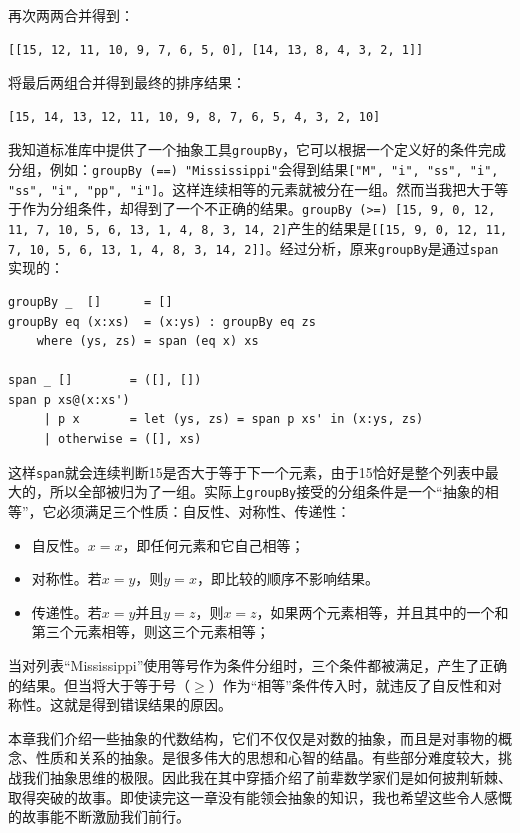 \documentclass{article}
\begin{document}
再次两两合并得到：

\begin{verbatim}
[[15, 12, 11, 10, 9, 7, 6, 5, 0], [14, 13, 8, 4, 3, 2, 1]]
\end{verbatim}

将最后两组合并得到最终的排序结果：

\begin{verbatim}
[15, 14, 13, 12, 11, 10, 9, 8, 7, 6, 5, 4, 3, 2, 10]
\end{verbatim}

我知道标准库中提供了一个抽象工具\texttt{groupBy}，它可以根据一个定义好的条件完成分组，例如：\texttt{groupBy (==) "Mississippi"}会得到结果\texttt{["M", "i", "ss", "i", "ss", "i", "pp", "i"]}。这样连续相等的元素就被分在一组。然而当我把大于等于作为分组条件，却得到了一个不正确的结果。\texttt{groupBy (>=) [15, 9, 0, 12, 11, 7, 10, 5, 6, 13, 1, 4, 8, 3, 14, 2]}产生的结果是\texttt{[[15, 9, 0, 12, 11, 7, 10, 5, 6, 13, 1, 4, 8, 3, 14, 2]]}。经过分析，原来\texttt{groupBy}是通过\texttt{span}实现的：

\lstset{language=Haskell, frame=single}
\begin{lstlisting}
groupBy _  []      = []
groupBy eq (x:xs)  = (x:ys) : groupBy eq zs
    where (ys, zs) = span (eq x) xs

span _ []        = ([], [])
span p xs@(x:xs')
     | p x       = let (ys, zs) = span p xs' in (x:ys, zs)
     | otherwise = ([], xs)
\end{lstlisting}

这样\texttt{span}就会连续判断15是否大于等于下一个元素，由于15恰好是整个列表中最大的，所以全部被归为了一组。实际上\texttt{groupBy}接受的分组条件是一个“抽象的相等”，它必须满足三个性质：自反性、对称性、传递性：

\begin{itemize}
\item 自反性。$x = x$，即任何元素和它自己相等；
\item 对称性。若$x = y$，则$y = x$，即比较的顺序不影响结果。
\item 传递性。若$x = y$并且$y = z$，则$x = z$，如果两个元素相等，并且其中的一个和第三个元素相等，则这三个元素相等；
\end{itemize}

当对列表``Mississippi''使用等号作为条件分组时，三个条件都被满足，产生了正确的结果。但当将大于等于号（$\geq$）作为“相等”条件传入时，就违反了自反性和对称性。这就是得到错误结果的原因。

本章我们介绍一些抽象的代数结构，它们不仅仅是对数的抽象，而且是对事物的概念、性质和关系的抽象。是很多伟大的思想和心智的结晶。有些部分难度较大，挑战我们抽象思维的极限。因此我在其中穿插介绍了前辈数学家们是如何披荆斩棘、取得突破的故事。即使读完这一章没有能领会抽象的知识，我也希望这些令人感慨的故事能不断激励我们前行。
\end{document}
